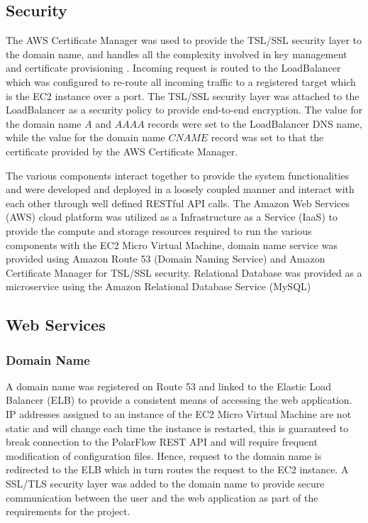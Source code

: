 \subsection{Security}
The AWS Certificate Manager was used to provide the TSL/SSL security layer to the domain name, and handles all the complexity involved in 
key management and certificate provisioning \cite{aws_acm}. Incoming request is routed to the LoadBalancer which was configured to re-route all incoming traffic 
to a registered target which is the EC2 instance over a port. The TSL/SSL security layer was attached to the LoadBalancer as a security policy 
to provide end-to-end encryption. The value for the domain name $A$ and $AAAA$ records were set to the LoadBalancer DNS name, while the value 
for the domain name $CNAME$ record was set to that the certificate provided by the AWS Certificate Manager.

The various components interact together to provide the system functionalities and were developed and deployed in a loosely coupled manner and
interact with each other through well defined RESTful API calls.  The Amazon Web Services (AWS) cloud platform was utilized as a Infrastructure
as a Service (IaaS) to provide the compute and storage resources required to run the various components with the EC2 Micro Virtual Machine, 
domain name service was provided using Amazon Route 53 (Domain Naming Service) and Amazon Certificate Manager for TSL/SSL security. Relational 
Database was provided as a microservice using the Amazon Relational Database Service (MySQL)





\subsection{Web Services}


\subsubsection*{Domain Name} A domain name was registered on Route 53 and linked to the Elastic Load Balancer (ELB) to provide a consistent means of 
accessing the web application. IP addresses assigned to an instance of the EC2 Micro Virtual Machine are not static and will change each time the 
instance is restarted, this is guaranteed to break connection to the PolarFlow REST API and will require frequent modification of configuration files. 
Hence, request to the domain name is redirected to the ELB which in turn routes the request to the EC2 instance. A SSL/TLS security layer was added to 
the domain name to provide secure communication between the user and the web application as part of the requirements for the project. 


